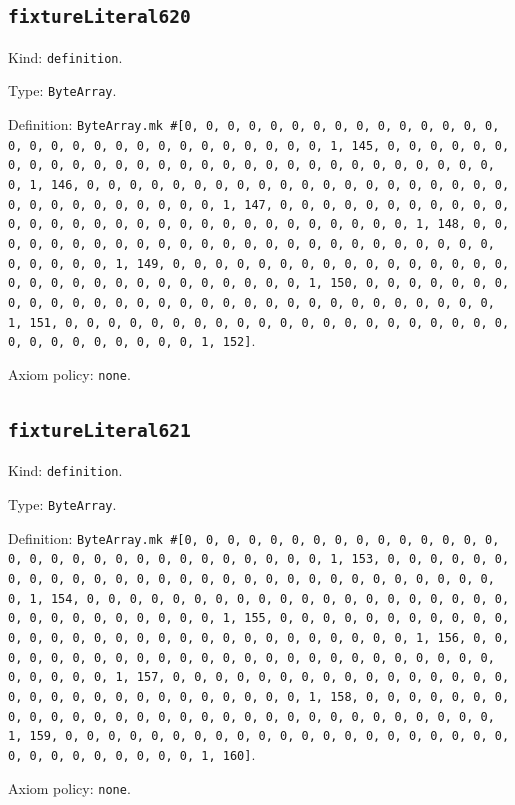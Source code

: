 \documentclass[11pt]{article}
\begin{document}
\subsection*{\texttt{fixtureLiteral620}}
\noindent Kind: \texttt{definition}.\par
\noindent Type: \texttt{ByteArray}.\par
\noindent Definition: \texttt{ByteArray.mk \#[0, 0, 0, 0, 0, 0, 0, 0, 0, 0, 0, 0, 0, 0, 0, 0, 0, 0, 0, 0, 0, 0, 0, 0, 0, 0, 0, 0, 0, 0, 1, 145, 0, 0, 0, 0, 0, 0, 0, 0, 0, 0, 0, 0, 0, 0, 0, 0, 0, 0, 0, 0, 0, 0, 0, 0, 0, 0, 0, 0, 0, 0, 1, 146, 0, 0, 0, 0, 0, 0, 0, 0, 0, 0, 0, 0, 0, 0, 0, 0, 0, 0, 0, 0, 0, 0, 0, 0, 0, 0, 0, 0, 0, 0, 1, 147, 0, 0, 0, 0, 0, 0, 0, 0, 0, 0, 0, 0, 0, 0, 0, 0, 0, 0, 0, 0, 0, 0, 0, 0, 0, 0, 0, 0, 0, 0, 1, 148, 0, 0, 0, 0, 0, 0, 0, 0, 0, 0, 0, 0, 0, 0, 0, 0, 0, 0, 0, 0, 0, 0, 0, 0, 0, 0, 0, 0, 0, 0, 1, 149, 0, 0, 0, 0, 0, 0, 0, 0, 0, 0, 0, 0, 0, 0, 0, 0, 0, 0, 0, 0, 0, 0, 0, 0, 0, 0, 0, 0, 0, 0, 1, 150, 0, 0, 0, 0, 0, 0, 0, 0, 0, 0, 0, 0, 0, 0, 0, 0, 0, 0, 0, 0, 0, 0, 0, 0, 0, 0, 0, 0, 0, 0, 1, 151, 0, 0, 0, 0, 0, 0, 0, 0, 0, 0, 0, 0, 0, 0, 0, 0, 0, 0, 0, 0, 0, 0, 0, 0, 0, 0, 0, 0, 0, 0, 1, 152]}.\par
\noindent Axiom policy: \texttt{none}.\par
\subsection*{\texttt{fixtureLiteral621}}
\noindent Kind: \texttt{definition}.\par
\noindent Type: \texttt{ByteArray}.\par
\noindent Definition: \texttt{ByteArray.mk \#[0, 0, 0, 0, 0, 0, 0, 0, 0, 0, 0, 0, 0, 0, 0, 0, 0, 0, 0, 0, 0, 0, 0, 0, 0, 0, 0, 0, 0, 0, 1, 153, 0, 0, 0, 0, 0, 0, 0, 0, 0, 0, 0, 0, 0, 0, 0, 0, 0, 0, 0, 0, 0, 0, 0, 0, 0, 0, 0, 0, 0, 0, 1, 154, 0, 0, 0, 0, 0, 0, 0, 0, 0, 0, 0, 0, 0, 0, 0, 0, 0, 0, 0, 0, 0, 0, 0, 0, 0, 0, 0, 0, 0, 0, 1, 155, 0, 0, 0, 0, 0, 0, 0, 0, 0, 0, 0, 0, 0, 0, 0, 0, 0, 0, 0, 0, 0, 0, 0, 0, 0, 0, 0, 0, 0, 0, 1, 156, 0, 0, 0, 0, 0, 0, 0, 0, 0, 0, 0, 0, 0, 0, 0, 0, 0, 0, 0, 0, 0, 0, 0, 0, 0, 0, 0, 0, 0, 0, 1, 157, 0, 0, 0, 0, 0, 0, 0, 0, 0, 0, 0, 0, 0, 0, 0, 0, 0, 0, 0, 0, 0, 0, 0, 0, 0, 0, 0, 0, 0, 0, 1, 158, 0, 0, 0, 0, 0, 0, 0, 0, 0, 0, 0, 0, 0, 0, 0, 0, 0, 0, 0, 0, 0, 0, 0, 0, 0, 0, 0, 0, 0, 0, 1, 159, 0, 0, 0, 0, 0, 0, 0, 0, 0, 0, 0, 0, 0, 0, 0, 0, 0, 0, 0, 0, 0, 0, 0, 0, 0, 0, 0, 0, 0, 0, 1, 160]}.\par
\noindent Axiom policy: \texttt{none}.\par
\end{document}
